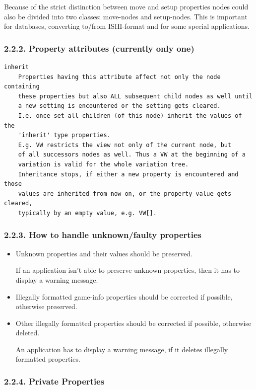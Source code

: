 Because of the strict distinction between move and setup properties
nodes could also be divided into two classes: move-nodes and
setup-nodes. This is important for databases, converting to/from
ISHI-format and for some special applications.

\subsubsection{2.2.2. Property attributes (currently only
one)}\label{property-attributes-currently-only-one}

\begin{verbatim}
inherit
    Properties having this attribute affect not only the node containing
    these properties but also ALL subsequent child nodes as well until
    a new setting is encountered or the setting gets cleared.
    I.e. once set all children (of this node) inherit the values of the
    'inherit' type properties.
    E.g. VW restricts the view not only of the current node, but
    of all successors nodes as well. Thus a VW at the beginning of a
    variation is valid for the whole variation tree.
    Inheritance stops, if either a new property is encountered and those
    values are inherited from now on, or the property value gets cleared,
    typically by an empty value, e.g. VW[].
\end{verbatim}

\subsubsection{2.2.3. How to handle unknown/faulty
properties}\label{how-to-handle-unknownfaulty-properties}

\begin{itemize}
\item
  Unknown properties and their values should be preserved.

  If an application isn't able to preserve unknown properties, then it
  has to display a warning message.
\item
  Illegally formatted game-info properties should be corrected if
  possible, otherwise preserved.
\item
  Other illegally formatted properties should be corrected if possible,
  otherwise deleted.

  An application has to display a warning message, if it deletes
  illegally formatted properties.
\end{itemize}

\subsubsection{2.2.4. Private Properties}\label{private-properties}

